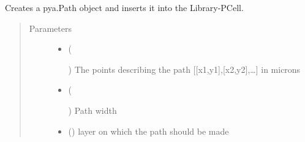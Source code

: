 \documentclass[a4paper,10pt,english]{sphinxmanual}
\begin{document}
\begin{fulllineitems}
\begin{fulllineitems}
\begin{quote}
\begin{description}
\end{description}\end{quote}

\end{fulllineitems}


\begin{fulllineitems}
\label{\detokenize{photonics/photonics:kppc.photonics.PhotDevice.create_path}}
Creates a pya.Path object and inserts it into the Library-PCell.
\begin{quote}\begin{description}
\item[{Parameters}] \leavevmode\begin{itemize}
\item {} 
 (%
\begin{footnote}[58]\sphinxAtStartFootnote
{}
%
\end{footnote}) \textendash{} The points describing the path {[}{[}x1,y1{]},{[}x2,y2{]},…{]} in microns

\item {} 
 (%
\begin{footnote}[59]\sphinxAtStartFootnote
{}
%
\end{footnote}) \textendash{} Path width

\item {} 
 () \textendash{} layer on which the path should be made

\end{itemize}

\end{description}\end{quote}

\end{fulllineitems}


\end{fulllineitems}
\end{document}
